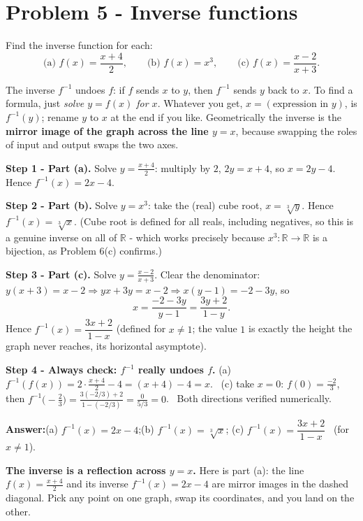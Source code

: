 \documentclass[11pt,a4paper]{article}
\newcommand{\R}{\mathbb{R}}
\newcommand{\answer}[1]{\begin{answerbox}\centering\textbf{Answer:}\quad #1\end{answerbox}}
\begin{document}
\section*{Problem 5 - Inverse functions}

\begin{problembox}[5]
Find the inverse function for each:
\[
\text{(a) } f(x)=\frac{x+4}{2},\qquad
\text{(b) } f(x)=x^3,\qquad
\text{(c) } f(x)=\frac{x-2}{x+3}.
\]
\end{problembox}

\begin{ideabox}
The inverse $f^{-1}$ undoes $f$: if $f$ sends $x$ to $y$, then $f^{-1}$ sends $y$ back to $x$. To
find a formula, just \emph{solve $y=f(x)$ for $x$}. Whatever you get, $x=(\text{expression in }y)$,
is $f^{-1}(y)$; rename $y$ to $x$ at the end if you like. Geometrically the inverse is the
\textbf{mirror image of the graph across the line $y=x$}, because swapping the roles of input and
output swaps the two axes.
\end{ideabox}

\textbf{Step 1 - Part (a).} Solve $y=\tfrac{x+4}{2}$: multiply by $2$, $2y=x+4$, so $x=2y-4$.
Hence $f^{-1}(x)=2x-4$.

\textbf{Step 2 - Part (b).} Solve $y=x^3$: take the (real) cube root, $x=\sqrt[3]{y}$. Hence
$f^{-1}(x)=\sqrt[3]{x}$. (Cube root is defined for all reals, including negatives, so this is a
genuine inverse on all of $\R$ - which works precisely because $x^3:\R\to\R$ is a bijection, as
Problem 6(c) confirms.)

\textbf{Step 3 - Part (c).} Solve $y=\tfrac{x-2}{x+3}$. Clear the denominator:
$y(x+3)=x-2\Rightarrow yx+3y=x-2\Rightarrow x(y-1)=-2-3y$, so
\[
x=\frac{-2-3y}{y-1}=\frac{3y+2}{1-y}.
\]
Hence $f^{-1}(x)=\dfrac{3x+2}{1-x}$ (defined for $x\ne1$; the value $1$ is exactly the height the
graph never reaches, its horizontal asymptote).

\textbf{Step 4 - Always check: $f^{-1}$ really undoes $f$.}
(a) $f^{-1}(f(x))=2\cdot\tfrac{x+4}{2}-4=(x+4)-4=x$. \checkmark\
(c) take $x=0$: $f(0)=\tfrac{-2}{3}$, then $f^{-1}\!\bigl(-\tfrac23\bigr)
=\tfrac{3(-2/3)+2}{1-(-2/3)}=\tfrac{0}{5/3}=0$. \checkmark\ Both directions verified numerically.

\answer{(a) $f^{-1}(x)=2x-4$;\quad (b) $f^{-1}(x)=\sqrt[3]{x}$;\quad
(c) $f^{-1}(x)=\dfrac{3x+2}{1-x}$ \ (for $x\ne1$).}

\medskip
\textbf{The inverse is a reflection across $y=x$.} Here is part (a): the line $f(x)=\tfrac{x+4}{2}$
and its inverse $f^{-1}(x)=2x-4$ are mirror images in the dashed diagonal. Pick any point on one
graph, swap its coordinates, and you land on the other.
\end{document}
